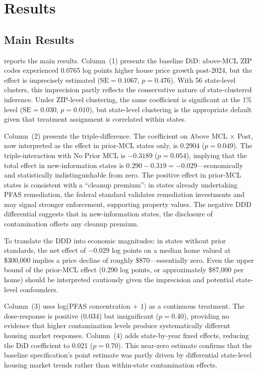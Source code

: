 \documentclass[12pt]{article}
\begin{document}
\section{Results}

\subsection{Main Results}



 reports the main results. Column~(1) presents the baseline DiD: above-MCL ZIP codes experienced 0.0765 log points higher house price growth post-2024, but the effect is imprecisely estimated ($\text{SE} = 0.1067$, $p = 0.476$). With 56 state-level clusters, this imprecision partly reflects the conservative nature of state-clustered inference. Under ZIP-level clustering, the same coefficient is significant at the 1\% level ($\text{SE} = 0.030$, $p = 0.010$), but state-level clustering is the appropriate default given that treatment assignment is correlated within states.

Column~(2) presents the triple-difference. The coefficient on Above MCL $\times$ Post, now interpreted as the effect in prior-MCL states only, is 0.2904 ($p = 0.049$). The triple-interaction with No Prior MCL is $-0.3189$ ($p = 0.054$), implying that the total effect in new-information states is $0.290 - 0.319 = -0.029$---economically and statistically indistinguishable from zero. The positive effect in prior-MCL states is consistent with a ``cleanup premium'': in states already undertaking PFAS remediation, the federal standard validates remediation investments and may signal stronger enforcement, supporting property values. The negative DDD differential suggests that in new-information states, the disclosure of contamination offsets any cleanup premium.

To translate the DDD into economic magnitudes: in states without prior standards, the net effect of $-0.029$ log points on a median home valued at \$300,000 implies a price decline of roughly \$870---essentially zero. Even the upper bound of the prior-MCL effect (0.290 log points, or approximately \$87,000 per home) should be interpreted cautiously given the imprecision and potential state-level confounders.

Column~(3) uses log(PFAS concentration + 1) as a continuous treatment. The dose-response is positive (0.034) but insignificant ($p = 0.40$), providing no evidence that higher contamination levels produce systematically different housing market responses. Column~(4) adds state-by-year fixed effects, reducing the DiD coefficient to 0.021 ($p = 0.70$). This near-zero estimate confirms that the baseline specification's point estimate was partly driven by differential state-level housing market trends rather than within-state contamination effects.
\end{document}
